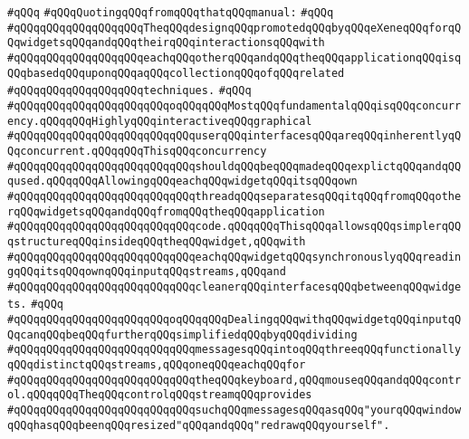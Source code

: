 \verb|#qQQq|\newline
\verb|#qQQqQuotingqQQqfromqQQqthatqQQqmanual:|\newline
\verb|#qQQq|\newline
\verb|#qQQqqQQqqQQqqQQqqQQqTheqQQqdesignqQQqpromotedqQQqbyqQQqeXeneqQQqforqQQqwidgetsqQQqandqQQqtheirqQQqinteractionsqQQqwith|\newline
\verb|#qQQqqQQqqQQqqQQqqQQqeachqQQqotherqQQqandqQQqtheqQQqapplicationqQQqisqQQqbasedqQQquponqQQqaqQQqcollectionqQQqofqQQqrelated|\newline
\verb|#qQQqqQQqqQQqqQQqqQQqtechniques.|\newline
\verb|#qQQq|\newline
\verb|#qQQqqQQqqQQqqQQqqQQqqQQqoqQQqqQQqMostqQQqfundamentalqQQqisqQQqconcurrency.qQQqqQQqHighlyqQQqinteractiveqQQqgraphical|\newline
\verb|#qQQqqQQqqQQqqQQqqQQqqQQqqQQquserqQQqinterfacesqQQqareqQQqinherentlyqQQqconcurrent.qQQqqQQqThisqQQqconcurrency|\newline
\verb|#qQQqqQQqqQQqqQQqqQQqqQQqqQQqshouldqQQqbeqQQqmadeqQQqexplictqQQqandqQQqused.qQQqqQQqAllowingqQQqeachqQQqwidgetqQQqitsqQQqown|\newline
\verb|#qQQqqQQqqQQqqQQqqQQqqQQqqQQqthreadqQQqseparatesqQQqitqQQqfromqQQqotherqQQqwidgetsqQQqandqQQqfromqQQqtheqQQqapplication|\newline
\verb|#qQQqqQQqqQQqqQQqqQQqqQQqqQQqcode.qQQqqQQqThisqQQqallowsqQQqsimplerqQQqstructureqQQqinsideqQQqtheqQQqwidget,qQQqwith|\newline
\verb|#qQQqqQQqqQQqqQQqqQQqqQQqqQQqeachqQQqwidgetqQQqsynchronouslyqQQqreadingqQQqitsqQQqownqQQqinputqQQqstreams,qQQqand|\newline
\verb|#qQQqqQQqqQQqqQQqqQQqqQQqqQQqcleanerqQQqinterfacesqQQqbetweenqQQqwidgets.|\newline
\verb|#qQQq|\newline
\verb|#qQQqqQQqqQQqqQQqqQQqqQQqoqQQqqQQqDealingqQQqwithqQQqwidgetqQQqinputqQQqcanqQQqbeqQQqfurtherqQQqsimplifiedqQQqbyqQQqdividing|\newline
\verb|#qQQqqQQqqQQqqQQqqQQqqQQqqQQqmessagesqQQqintoqQQqthreeqQQqfunctionallyqQQqdistinctqQQqstreams,qQQqoneqQQqeachqQQqfor|\newline
\verb|#qQQqqQQqqQQqqQQqqQQqqQQqqQQqtheqQQqkeyboard,qQQqmouseqQQqandqQQqcontrol.qQQqqQQqTheqQQqcontrolqQQqstreamqQQqprovides|\newline
\verb|#qQQqqQQqqQQqqQQqqQQqqQQqqQQqsuchqQQqmessagesqQQqasqQQq"yourqQQqwindowqQQqhasqQQqbeenqQQqresized"qQQqandqQQq"redrawqQQqyourself".|\newline
